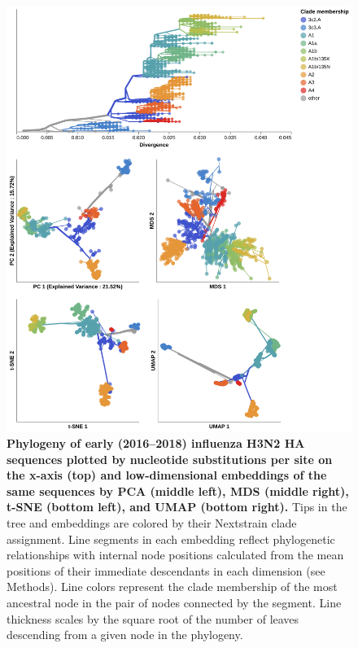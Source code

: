 \documentclass[webpdf,contemporary,large,single]{oup-authoring-template}%
\theoremstyle{thmstyleone}%
\theoremstyle{thmstyletwo}%
\theoremstyle{thmstylethree}%
\begin{document}
\begin{figure}[!h]
\includegraphics[width=0.9\columnwidth]{figures/flu-2016-2018-ha-embeddings-by-clade.png}
\caption{{\bf Phylogeny of early (2016--2018) influenza H3N2 HA sequences plotted by nucleotide substitutions per site on the x-axis (top) and low-dimensional embeddings of the same sequences by PCA (middle left), MDS (middle right), t-SNE (bottom left), and UMAP (bottom right).}
  Tips in the tree and embeddings are colored by their Nextstrain clade assignment.
  Line segments in each embedding reflect phylogenetic relationships with internal node positions calculated from the mean positions of their immediate descendants in each dimension (see Methods).
  Line colors represent the clade membership of the most ancestral node in the pair of nodes connected by the segment.
  Line thickness scales by the square root of the number of leaves descending from a given node in the phylogeny.
}
\label{fig:seasonal-influenza-h3n2-ha-embeddings}
\end{figure}
\end{document}
